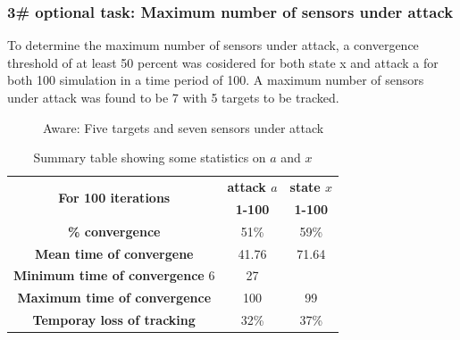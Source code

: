     \subsubsection*{3\# optional task: Maximum number of sensors under attack}
    To determine the maximum number of sensors under attack, a convergence threshold of at least 50 percent was cosidered for both state x and attack a for both 100 simulation in a time period of 100. A maximum number of sensors under attack was found to be 7 with 5 targets to be tracked.
    \begin{figure}
    \centering
    \caption{Aware: Five targets and seven sensors under attack}
    \end{figure}
\begin{table}[h!]
\centering
\begin{tabular}{|c|c|c|}
\hline
\multirow{2}{*}{\textbf{For 100 iterations}} & \multicolumn{1}{|c|}{\textbf{attack $a$}} & \multicolumn{1}{|c|}{\textbf{state $x$}} \\
\cline{2-3}
 & \textbf{1-100} & \textbf{1-100}\\
\hline
\textbf{\% convergence} &51\% &59\%  \\
\hline
\textbf{Mean time of convergene} &41.76 &71.64 \\
\hline
\textbf{Minimum time of convergence} 6 &27  \\
\hline
\textbf{Maximum time of convergence} &100 &99 \\
\hline
\textbf{Temporay loss of tracking} &32\% &37\%  \\
\hline
\end{tabular}
\caption{Summary table showing some statistics on $a$ and $x$}
\label{table:3}
\end{table}


